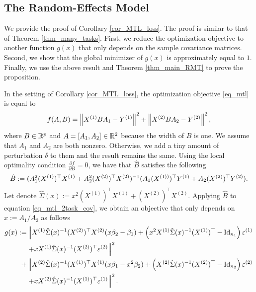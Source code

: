 \subsection{The Random-Effects Model}\label{app_iso_cov}

We provide the proof of Corollary \ref{cor_MTL_loss}. The proof is similar to that of Theorem \ref{thm_many_tasks}.
First, we reduce the optimization objective to another function $g(x)$ that only depends on the sample covariance matrices.
Second, we show that the global minimizer of $g(x)$ is approximately equal to $1$.
Finally, we use the above result and Theorem \ref{thm_main_RMT} to prove the proposition.

In the setting of Corollary \ref{cor_MTL_loss}, the optimization objective \eqref{eq_mtl} is equal to
	\begin{align}
		f(A, B) =   \left\| X^{(1)} B A_1 - Y^{(1)} \right\|^2+ \left\| X^{(2)} B A_2 - Y^{(2)} \right\|^2, \label{eq_mtl_2task_cov}
	\end{align}
	where $B \in \mathbb{R}^{p}$ and $A = [A_1, A_2]\in \mathbb{R}^{2}$ because the width of $B$ is one.
We assume that $A_1$ and $A_2$ are both nonzero.
Otherwise, we add a tiny amount of perturbation $\delta$ to them and the result remains the same.
Using the local optimality condition $\frac{\partial f}{\partial B} = 0$, we have that $\hat{B}$ satisfies the following
	\begin{align}
		\hat{B} \define  (A_1^2 (X^{(1)})^{\top}X^{(1)} + A_2^2 (X^{(2)})^{\top}X^{(2)})^{-1} (A_1 (X^{(1))})^{\top}Y^{(1)} + A_2 (X^{(2)})^{\top}Y^{(2)}). \label{eq_Bhat_2task} %
	\end{align}
Let denote $\hat \Sigma(x):= x^2 (X^{(1)})^\top X^{(1)}  + (X^{(2)})^\top X^{(2)}$.
Applying $\hat B$ to equation \eqref{eq_mtl_2task_cov}, we obtain an objective that only depends on $x:=A_1/A_2$ as follows %
 \begin{align}
		 g(x) := & \left\| X^{(1)} \hat\Sigma(x)^{-1} (X^{(2)})^\top X^{(2)} (x\beta_2-\beta_1)+ \left(x^2 X^{(1)}\hat \Sigma(x)^{-1} (X^{(1)})^\top-\operatorname{Id}_{n_1}\right)\varepsilon^{(1)} \right. \nonumber\\
		& \left. + x X^{(1)}\hat \Sigma(x)^{-1} (X^{(2)})^\top \varepsilon^{(2)} \right\|^2 \nonumber\\
		 + & \left\| X^{(2)} \hat \Sigma(x)^{-1} (X^{(1)})^\top X^{(1)} (x\beta_1-x^2\beta_2)+ \left(X^{(2)}\hat\Sigma(x)^{-1} (X^{(2)})^\top-\operatorname{Id}_{n_2}\right)\varepsilon^{(2)} \right. \nonumber\\
		 &\left. + x X^{(2)}\hat \Sigma(x)^{-1} (X^{(1)})^\top \varepsilon^{(1)} \right\|^2.
		\label{eq_mtl_A12}
	\end{align}
